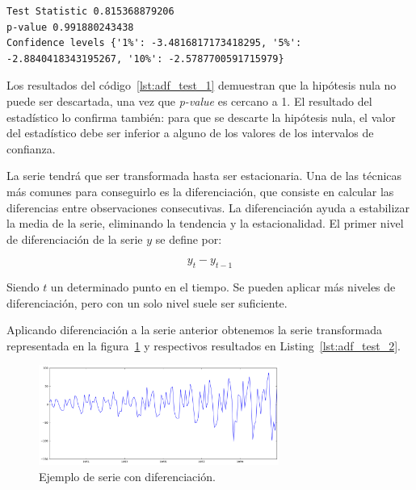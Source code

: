 \documentclass[11pt,spanish,listoffigures,listoftables]{tfgetsinf}
\begin{document}
    \lstset{style=python}
    \begin{lstlisting}[caption=Resultados del test de Dickey-Fuller de {\tt statsmodels} de Python., label={lst:adf_res_1}]
Test Statistic 0.815368879206
p-value 0.991880243438
Confidence levels {'1%': -3.4816817173418295, '5%': -2.8840418343195267, '10%': -2.5787700591715979}
    \end{lstlisting}
    
    Los resultados del código~\ref{lst:adf_test_1} demuestran que la hipótesis nula no puede ser descartada, una vez que {\em p-value} es cercano a 1. El resultado del estadístico lo confirma también: para que se descarte la hipótesis nula, el valor del estadístico debe ser inferior a alguno de los valores de los intervalos de confianza.
    
    La serie tendrá que ser transformada hasta ser estacionaria. Una de las técnicas más comunes para conseguirlo es la diferenciación, que consiste en calcular las diferencias entre observaciones consecutivas. La diferenciación ayuda a estabilizar la media de la serie, eliminando la tendencia y la estacionalidad. El primer nivel de diferenciación de la serie \(y\) se define por:
    
    \begin{equation}
    y_{t}-y_{t-1}
    \end{equation}
    
    Siendo \(t\) un determinado punto en el tiempo. Se pueden aplicar más niveles de diferenciación, pero con un solo nivel suele ser suficiente.
    
    Aplicando diferenciación a la serie anterior obtenemos la serie transformada representada en la figura~\ref{fig:ts_diff} y respectivos resultados en Listing~\ref{lst:adf_test_2}.
    
    \begin{figure}[h]
        \centering
        \includegraphics[width=0.7\textwidth]{ts_diff.png}
        \caption{Ejemplo de serie con diferenciación.}
        \label{fig:ts_diff}
    \end{figure}
    
\end{document}
